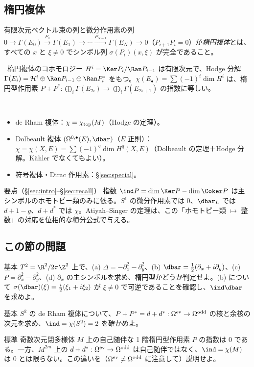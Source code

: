 \subsection{楕円複体}
有限次元ベクトル束の列と微分作用素の列 $0\to\Gamma(E_0)\xrightarrow{P_0}\Gamma(E_1)\to\cdots\xrightarrow{P_{N-1}}\Gamma(E_N)\to0$（$P_{i+1}P_i=0$）が\emph{楕円複体}とは、すべての $x$ と $\xi\ne0$ でシンボル列 $\sigma(P_i)(x,\xi)$ が完全であること。
\begin{thm}[第7巻]\label{thm:ellcomplex}\tC\
楕円複体のコホモロジー $H^i=\Ker P_i/\Ran P_{i-1}$ は有限次元で、Hodge 分解 $\Gamma(E_i)=\mathcal H^i\oplus\Ran P_{i-1}\oplus\Ran P_i^*$ をもつ。$\chi(E_\bullet)=\sum(-1)^i\dim H^i$ は、楕円型作用素 $P+P^*:\bigoplus_i\Gamma(E_{2i})\to\bigoplus_i\Gamma(E_{2i+1})$ の指数に等しい。
\end{thm}
\begin{ex}[三つの楕円複体]\label{ex:complexes}\tC\
\begin{itemize}
\item de Rham 複体：$\chi=\chi_{\rm top}(M)$（Hodge の定理）。
\item Dolbeault 複体 $(\Omega^{0,\bullet}(E),\dbar)$（$E$ 正則）：$\chi=\chi(X,E)=\sum(-1)^q\dim H^q(X,E)$（Dolbeault の定理＋Hodge 分解。Kähler でなくてもよい）。
\item 符号複体・Dirac 作用素：§\ref{sec:special}。
\end{itemize}
\end{ex}
\begin{keybox}{要点（\S\ref{sec:intro}--\S\ref{sec:recall}）}
指数 $\ind P=\dim\Ker P-\dim\Coker P$ は主シンボルのホモトピー類のみに依る。$S^1$ の微分作用素では $0$、$\dbar_L$ では $d+1-g$、$d+d^*$ では $\chi$。Atiyah--Singer の定理は、この「ホモトピー類 $\mapsto$ 整数」の対応を位相的な積分公式で与える。
\end{keybox}
\subsection*{この節の問題}
\begin{prob}{基本}\label{p:ellcheck}
$T^2=\R^2/2\pi\Z^2$ 上で、(a) $\Delta=-\partial_x^2-\partial_y^2$、(b) $\dbar=\frac12(\partial_x+i\partial_y)$、(c) $P=\partial_x^2-\partial_y^2$、(d) $\partial_x$ の主シンボルを求め、楕円型かどうか判定せよ。(b) について $\sigma(\dbar)(\xi)=\frac i2(\xi_1+i\xi_2)$ が $\xi\ne0$ で可逆であることを確認し、$\ind\dbar$ を求めよ。
\end{prob}
\begin{prob}{基本}\label{p:complexind}
$S^2$ の de Rham 複体について、$P+P^*=d+d^*:\Omega^{\rm ev}\to\Omega^{\rm odd}$ の核と余核の次元を求め、$\ind=\chi(S^2)=2$ を確かめよ。
\end{prob}
\begin{prob}{標準}\label{p:selfadj}
奇数次元閉多様体 $M$ 上の自己随伴な 1 階楕円型作用素 $P$ の指数は $0$ である。一方、$M^{2m}$ 上の $d+d^*:\Omega^{\rm ev}\to\Omega^{\rm odd}$ は自己随伴ではなく、$\ind=\chi(M)$ は $0$ とは限らない。この違いを（$\Omega^{\rm ev}\ne\Omega^{\rm odd}$ に注意して）説明せよ。
\end{prob}
